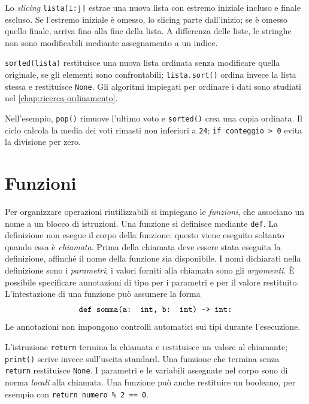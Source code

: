 Lo \emph{slicing} \texttt{lista[i:j]} estrae una nuova lista con estremo
iniziale incluso e finale escluso. Se l'estremo iniziale è omesso,
lo slicing parte dall'inizio; se è omesso quello finale, arriva fino
alla fine della lista. A differenza delle liste, le stringhe non sono
modificabili mediante assegnamento a un indice.

\texttt{sorted(lista)} restituisce una nuova lista ordinata senza
modificare quella originale, se gli elementi sono confrontabili;
\texttt{lista.sort()} ordina invece la lista stessa e restituisce
\texttt{None}. Gli algoritmi impiegati per ordinare i dati sono
studiati nel \cref{chap:ricerca-ordinamento}.



Nell'esempio, \texttt{pop()} rimuove l'ultimo voto e
\texttt{sorted()} crea una copia ordinata. Il ciclo calcola la media
dei voti rimasti non inferiori a \texttt{24};
\texttt{if conteggio > 0} evita la divisione per zero.

\clearpage

\section{Funzioni}
\label{sec:fi-python-funzioni}

Per organizzare operazioni riutilizzabili si impiegano le \emph{funzioni},
che associano un nome a un blocco di istruzioni. Una funzione si definisce
mediante \texttt{def}. La definizione non esegue il corpo della
funzione: questo viene eseguito soltanto quando essa è \emph{chiamata}.
Prima della chiamata deve essere stata eseguita la definizione,
affinché il nome della funzione sia disponibile. I nomi dichiarati
nella definizione sono i
\emph{parametri}; i valori forniti alla chiamata
sono gli \emph{argomenti}. È possibile specificare annotazioni di tipo per
i parametri e per il valore restituito. L'intestazione di una funzione può
assumere la forma
\[
  \text{\texttt{def somma(a: int, b: int) -> int:}}
\]
Le annotazioni non impongono controlli automatici sui tipi durante
l'esecuzione.

L'istruzione \texttt{return} termina la chiamata e restituisce un
valore al chiamante; \texttt{print()} scrive invece sull'uscita
standard. Una funzione che termina senza \texttt{return} restituisce
\texttt{None}. I parametri e le variabili assegnate nel corpo sono
di norma \emph{locali} alla chiamata. Una funzione può anche
restituire un booleano, per esempio con
\texttt{return numero \% 2 == 0}.

